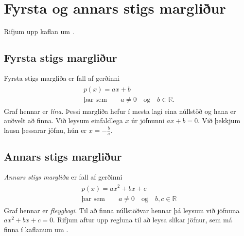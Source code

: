 \documentclass[a4paper,10pt,icelandic]{sphinxmanual}
\begin{document}
\section{Fyrsta og annars stigs margliður}
\label{\detokenize{Kafli06:fyrsta-og-annars-stigs-margliur}}
Rifjum upp kaflan um {\hyperref[\detokenize{Kafli02:s-jofnur}]{}}.


\subsection{Fyrsta stigs margliður}
\label{\detokenize{Kafli06:fyrsta-stigs-margliur}}
Fyrsta stigs margliða er fall af gerðinni
\begin{equation*}
\begin{split}\begin{aligned}
&p(x)=ax+b \\
&\text{þar sem} \qquad a \neq 0 \quad \text{og} \quad b \in \mathbb{R}.
\end{aligned}\end{split}
\end{equation*}
Graf hennar er \textit{lína}. Þessi margliða hefur í mesta lagi eina núllstöð og hana er auðvelt að finna.
Við leysum einfaldlega \(x\) úr jöfnunni \(ax+b=0\). Við þekkjum lausn þessarar jöfnu, hún er \(x=-\frac{b}{a}\).


\subsection{Annars stigs margliður}
\label{\detokenize{Kafli06:annars-stigs-margliur}}\label{\detokenize{Kafli06:s-annarsstigs}}
\textit{Annars stigs margliða} er fall af gerðinni
\begin{equation*}
\begin{split}\begin{aligned}
&p(x)=ax^2+bx+c \\
&\text{þar sem} \qquad a \neq 0 \quad \text{og} \quad b,c \in \mathbb{R}
\end{aligned}\end{split}
\end{equation*}
Graf hennar er \textit{fleygbogi}. Til að finna núllstöðvar hennar þá leysum við jöfnuna \(ax^2+bx+c=0\). Rifjum aftur upp regluna til að leysa slíkar jöfnur, sem má finna í kaflanum um {\hyperref[\detokenize{Kafli02:s-annars-stigs-jofnur}]{}}.
\end{document}
